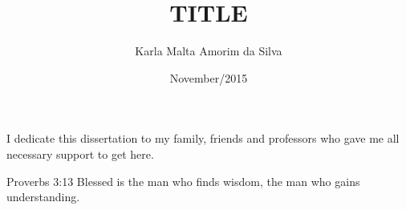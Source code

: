 \documentclass[en,twoside,onehalfspacing,bsc]{risethesis}
\title{TITLE}
\date{November/2015}
\author{Karla Malta Amorim da Silva}
\begin{document}
\frontmatter
\frontpage
\presentationpage

\begin{dedicatory}
I dedicate this dissertation to my family, friends and
professors who gave me all necessary support to get here.
\end{dedicatory}








\begin{epigraph}[]{Proverbs 3:13}
Blessed is the man who finds wisdom, the man who gains understanding. 
\end{epigraph}
\end{document}

